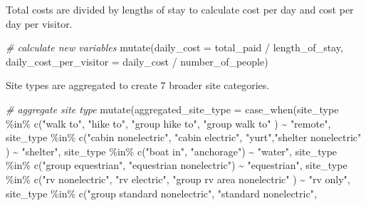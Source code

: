 \documentclass[
]{book}
\newenvironment{Shaded}{\begin{snugshade}}{\end{snugshade}}
\newcommand{\AttributeTok}[1]{\textcolor[rgb]{0.77,0.63,0.00}{#1}}
\newcommand{\CommentTok}[1]{\textcolor[rgb]{0.56,0.35,0.01}{\textit{#1}}}
\newcommand{\FunctionTok}[1]{\textcolor[rgb]{0.00,0.00,0.00}{#1}}
\newcommand{\NormalTok}[1]{#1}
\newcommand{\SpecialCharTok}[1]{\textcolor[rgb]{0.00,0.00,0.00}{#1}}
\newcommand{\StringTok}[1]{\textcolor[rgb]{0.31,0.60,0.02}{#1}}
\begin{document}
Total costs are divided by lengths of stay to calculate cost per day and cost per day per visitor.

\begin{Shaded}
\begin{Highlighting}[]
\CommentTok{\# calculate new variables}
\FunctionTok{mutate}\NormalTok{(}\AttributeTok{daily\_cost =}\NormalTok{ total\_paid }\SpecialCharTok{/}\NormalTok{ length\_of\_stay,}
       \AttributeTok{daily\_cost\_per\_visitor =}\NormalTok{ daily\_cost }\SpecialCharTok{/}\NormalTok{ number\_of\_people)}
\end{Highlighting}
\end{Shaded}

Site types are aggregated to create 7 broader site categories.

\begin{Shaded}
\begin{Highlighting}[]
\CommentTok{\# aggregate site type}
\FunctionTok{mutate}\NormalTok{(}\AttributeTok{aggregated\_site\_type =} 
         \FunctionTok{case\_when}\NormalTok{(site\_type }\SpecialCharTok{\%in\%} \FunctionTok{c}\NormalTok{(}\StringTok{"walk to"}\NormalTok{, }\StringTok{"hike to"}\NormalTok{, }\StringTok{"group hike to"}\NormalTok{, }\StringTok{"group walk to"}
\NormalTok{         ) }\SpecialCharTok{\textasciitilde{}} \StringTok{"remote"}\NormalTok{,}
\NormalTok{         site\_type }\SpecialCharTok{\%in\%} \FunctionTok{c}\NormalTok{(}\StringTok{"cabin nonelectric"}\NormalTok{, }\StringTok{"cabin electric"}\NormalTok{, }\StringTok{"yurt"}\NormalTok{,}\StringTok{"shelter nonelectric"}
\NormalTok{         ) }\SpecialCharTok{\textasciitilde{}} \StringTok{"shelter"}\NormalTok{,}
\NormalTok{         site\_type }\SpecialCharTok{\%in\%} \FunctionTok{c}\NormalTok{(}\StringTok{"boat in"}\NormalTok{, }\StringTok{"anchorage"}\NormalTok{) }\SpecialCharTok{\textasciitilde{}} \StringTok{"water"}\NormalTok{,}
\NormalTok{         site\_type }\SpecialCharTok{\%in\%} \FunctionTok{c}\NormalTok{(}\StringTok{"group equestrian"}\NormalTok{, }\StringTok{"equestrian nonelectric"}\NormalTok{) }\SpecialCharTok{\textasciitilde{}} \StringTok{"equestrian"}\NormalTok{,}
\NormalTok{         site\_type }\SpecialCharTok{\%in\%} \FunctionTok{c}\NormalTok{(}\StringTok{"rv nonelectric"}\NormalTok{, }\StringTok{"rv electric"}\NormalTok{, }\StringTok{"group rv area nonelectric"}
\NormalTok{         ) }\SpecialCharTok{\textasciitilde{}} \StringTok{"rv only"}\NormalTok{,}
\NormalTok{         site\_type }\SpecialCharTok{\%in\%} \FunctionTok{c}\NormalTok{(}\StringTok{"group standard nonelectric"}\NormalTok{, }\StringTok{"standard nonelectric"}\NormalTok{,}

\end{Highlighting}
\end{Shaded}
\end{document}
